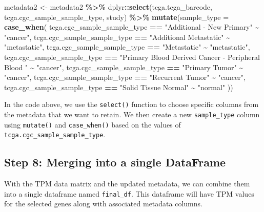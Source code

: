 \documentclass[
]{book}
\newenvironment{Shaded}{\begin{snugshade}}{\end{snugshade}}
\newcommand{\AttributeTok}[1]{\textcolor[rgb]{0.13,0.29,0.53}{#1}}
\newcommand{\FunctionTok}[1]{\textcolor[rgb]{0.13,0.29,0.53}{\textbf{#1}}}
\newcommand{\NormalTok}[1]{#1}
\newcommand{\OtherTok}[1]{\textcolor[rgb]{0.56,0.35,0.01}{#1}}
\newcommand{\SpecialCharTok}[1]{\textcolor[rgb]{0.81,0.36,0.00}{\textbf{#1}}}
\newcommand{\StringTok}[1]{\textcolor[rgb]{0.31,0.60,0.02}{#1}}
\begin{document}
\begin{Shaded}
\begin{Highlighting}[]
\NormalTok{metadata2 }\OtherTok{\textless{}{-}}\NormalTok{ metadata2 }\SpecialCharTok{\%\textgreater{}\%}
\NormalTok{  dplyr}\SpecialCharTok{::}\FunctionTok{select}\NormalTok{(tcga.tcga\_barcode, tcga.cgc\_sample\_sample\_type, study) }\SpecialCharTok{\%\textgreater{}\%}
  \FunctionTok{mutate}\NormalTok{(}\AttributeTok{sample\_type =} \FunctionTok{case\_when}\NormalTok{(}
\NormalTok{    tcga.cgc\_sample\_sample\_type }\SpecialCharTok{==} \StringTok{"Additional {-} New Primary"} \SpecialCharTok{\textasciitilde{}} \StringTok{"cancer"}\NormalTok{,}
\NormalTok{    tcga.cgc\_sample\_sample\_type }\SpecialCharTok{==} \StringTok{"Additional Metastatic"} \SpecialCharTok{\textasciitilde{}} \StringTok{"metastatic"}\NormalTok{,}
\NormalTok{    tcga.cgc\_sample\_sample\_type }\SpecialCharTok{==} \StringTok{"Metastatic"} \SpecialCharTok{\textasciitilde{}} \StringTok{"metastatic"}\NormalTok{,}
\NormalTok{    tcga.cgc\_sample\_sample\_type }\SpecialCharTok{==} \StringTok{"Primary Blood Derived Cancer {-} Peripheral Blood "} \SpecialCharTok{\textasciitilde{}} \StringTok{"cancer"}\NormalTok{,}
\NormalTok{    tcga.cgc\_sample\_sample\_type }\SpecialCharTok{==} \StringTok{"Primary Tumor"} \SpecialCharTok{\textasciitilde{}} \StringTok{"cancer"}\NormalTok{,}
\NormalTok{    tcga.cgc\_sample\_sample\_type }\SpecialCharTok{==} \StringTok{"Recurrent Tumor"} \SpecialCharTok{\textasciitilde{}} \StringTok{"cancer"}\NormalTok{,}
\NormalTok{    tcga.cgc\_sample\_sample\_type }\SpecialCharTok{==} \StringTok{"Solid Tissue Normal"} \SpecialCharTok{\textasciitilde{}} \StringTok{"normal"}
\NormalTok{  ))}
\end{Highlighting}
\end{Shaded}

In the code above, we use the \texttt{select()} function to choose specific columns from the metadata that we want to retain. We then create a new \texttt{sample\_type} column using \texttt{mutate()} and \texttt{case\_when()} based on the values of \texttt{tcga.cgc\_sample\_sample\_type}.

\hypertarget{step-8-merging-into-a-single-dataframe}{%
\subsection{Step 8: Merging into a single DataFrame}\label{step-8-merging-into-a-single-dataframe}}

With the TPM data matrix and the updated metadata, we can combine them into a single dataframe named \texttt{final\_df}. This dataframe will have TPM values for the selected genes along with associated metadata columns.
\end{document}
